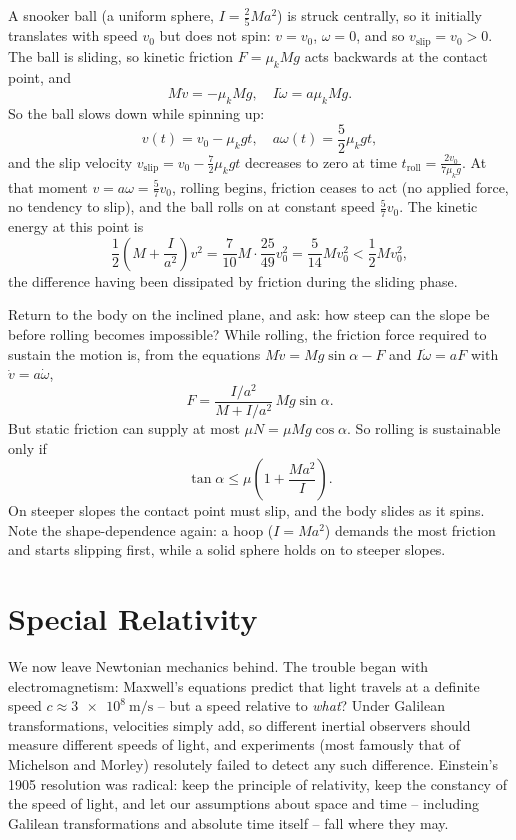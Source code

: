 \begin{example}
	A snooker ball (a uniform sphere, $I = \frac{2}{5}Ma^2$) is struck centrally, so it initially translates with speed $v_0$ but does not spin: $v = v_0$, $\omega = 0$, and so $v_{\text{slip}} = v_0 > 0$. The ball is sliding, so kinetic friction $F = \mu_k M g$ acts backwards at the contact point, and
	$$
	M \dot{v} = -\mu_k Mg, \quad I \dot{\omega} = a \mu_k M g.
	$$
	So the ball slows down while spinning up:
	$$
	v(t) = v_0 - \mu_k g t, \quad a\omega(t) = \frac{5}{2}\mu_k g t,
	$$
	and the slip velocity $v_{\text{slip}} = v_0 - \frac{7}{2}\mu_k g t$ decreases to zero at time $t_{\text{roll}} = \frac{2 v_0}{7 \mu_k g}$. At that moment $v = a\omega = \frac{5}{7}v_0$, rolling begins, friction ceases to act (no applied force, no tendency to slip), and the ball rolls on at constant speed $\frac{5}{7}v_0$. The kinetic energy at this point is
	$$
	\frac{1}{2}\left(M + \frac{I}{a^2}\right)v^2 = \frac{7}{10}M \cdot \frac{25}{49}v_0^2 = \frac{5}{14}Mv_0^2 < \frac{1}{2}Mv_0^2,
	$$
	the difference having been dissipated by friction during the sliding phase.
\end{example}

\begin{example}
	Return to the body on the inclined plane, and ask: how steep can the slope be before rolling becomes impossible? While rolling, the friction force required to sustain the motion is, from the equations $M \dot v = Mg\sin\alpha - F$ and $I \dot\omega = aF$ with $\dot v = a \dot \omega$,
	$$
	F = \frac{I/a^2}{M + I/a^2}\, Mg \sin\alpha.
	$$
	But static friction can supply at most $\mu N = \mu Mg \cos\alpha$. So rolling is sustainable only if
	$$
	\tan \alpha \leq \mu\left(1 + \frac{Ma^2}{I}\right).
	$$
	On steeper slopes the contact point must slip, and the body slides as it spins. Note the shape-dependence again: a hoop ($I = Ma^2$) demands the most friction and starts slipping first, while a solid sphere holds on to steeper slopes.
\end{example}
\section{Special Relativity} \label{sec:sr}

We now leave Newtonian mechanics behind. The trouble began with electromagnetism: Maxwell's equations predict that light travels at a definite speed $c \approx \SI{3e8}{\meter\per\second}$ -- but a speed relative to \emph{what}? Under Galilean transformations, velocities simply add, so different inertial observers should measure different speeds of light, and experiments (most famously that of Michelson and Morley) resolutely failed to detect any such difference. Einstein's 1905 resolution was radical: keep the principle of relativity, keep the constancy of the speed of light, and let our assumptions about space and time -- including Galilean transformations and absolute time itself -- fall where they may.

